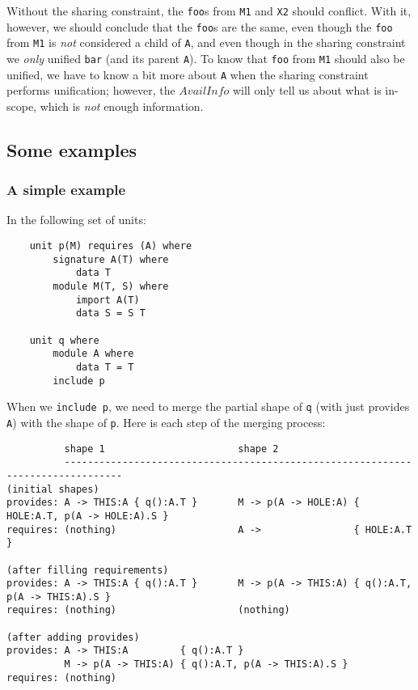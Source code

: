 \documentclass{article}
\newcommand{\I}[1]{\ensuremath{\mathit{#1}}}
\begin{document}
Without the sharing constraint, the \verb|foo|s from \verb|M1| and \verb|X2|
should conflict.  With it, however, we should conclude that the \verb|foo|s
are the same, even though the \verb|foo| from \verb|M1| is \emph{not}
considered a child of \verb|A|, and even though in the sharing constraint
we \emph{only} unified \verb|bar| (and its parent \verb|A|).  To know that
\verb|foo| from \verb|M1| should also be unified, we have to know a bit
more about \verb|A| when the sharing constraint performs unification;
however, the \I{AvailInfo} will only tell us about what is in-scope, which
is \emph{not} enough information.

\subsection{Some examples}

\subsubsection{A simple example}

In the following set of units:

\begin{verbatim}
    unit p(M) requires (A) where
        signature A(T) where
            data T
        module M(T, S) where
            import A(T)
            data S = S T

    unit q where
        module A where
            data T = T
        include p
\end{verbatim}

When we \verb|include p|, we need to merge the partial shape
of \verb|q| (with just provides \verb|A|) with the shape
of \verb|p|.  Here is each step of the merging process:

\begin{verbatim}
          shape 1                       shape 2
          --------------------------------------------------------------------------------
(initial shapes)
provides: A -> THIS:A { q():A.T }       M -> p(A -> HOLE:A) { HOLE:A.T, p(A -> HOLE:A).S }
requires: (nothing)                     A ->                { HOLE:A.T }

(after filling requirements)
provides: A -> THIS:A { q():A.T }       M -> p(A -> THIS:A) { q():A.T, p(A -> THIS:A).S }
requires: (nothing)                     (nothing)

(after adding provides)
provides: A -> THIS:A         { q():A.T }
          M -> p(A -> THIS:A) { q():A.T, p(A -> THIS:A).S }
requires: (nothing)
\end{verbatim}
\end{document}
